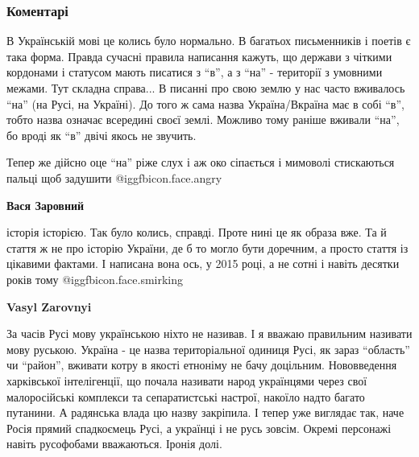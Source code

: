  
 
 
 
 
\subsubsection{Коментарі}
\label{sec:09_12_2021.fb.ruda_bogdana.1.derzh_kaznachejska_sluzhba_mova.cmt}

\begin{itemize} %

В Українській мові це колись було нормально. В багатьох письменників і поетів є
така форма. Правда сучасні правила написання кажуть, що держави з чіткими
кордонами і статусом мають писатися з \enquote{в}, а з \enquote{на} - території з умовними
межами. Тут складна справа... В писанні про свою землю у нас часто вживалось
\enquote{на} (на Русі, на Україні). До того ж сама назва Україна/Вкраїна має в собі
\enquote{в}, тобто назва означає всередині своєї землі. Можливо тому раніше вживали
\enquote{на}, бо вроді як \enquote{в} двічі якось не звучить.

Тепер же дійсно оце \enquote{на} ріже слух і аж око сіпається і мимоволі стискаються
пальці щоб задушити @igg{fbicon.face.angry} 

\begin{itemize} %
\textbf{Вася Заровний} 

історія історією. Так було колись, справді. Проте нині це як образа вже. Та й
стаття ж не про історію України, де б то могло бути доречним, а просто стаття
із цікавими фактами. І написана вона ось, у 2015 році, а не сотні і навіть
десятки років тому @igg{fbicon.face.smirking} 


\textbf{Vasyl Zarovnyi} 

За часів Русі мову українською ніхто не називав. І я вважаю правильним називати
мову руською. Україна - це назва територіальної одиниця Русі, як зараз
\enquote{область} чи \enquote{район}, вживати котру в якості етноніму не бачу доцільним.
Нововведення харківської інтелігенції, що почала називати народ українцями
через свої малоросійські комплекси та сепаратистські настрої, накоїло надто
багато путанини. А радянська влада цю назву закріпила. І тепер уже виглядає
так, наче Росія прямий спадкоємець Русі, а українці і не русь зовсім. Окремі
персонажі навіть русофобами вважаються. Іронія долі.


\end{itemize}
\end{itemize}
